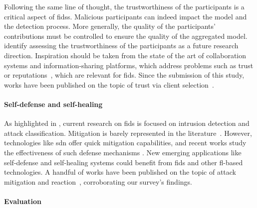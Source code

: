 Following the same line of thought, the trustworthiness of the participants is a critical aspect of \glspl{fids}.
Malicious participants can indeed impact the model and the detection process.
More generally, the quality of the participants' contributions must be controlled to ensure the quality of the aggregated model.
\textcite{zhang_BlockchainbasedFederatedLearning_2020} identify assessing the trustworthiness of the participants as a future research direction.
Inspiration should be taken from the state of the art of collaboration systems and information-sharing platforms, which address problems such as trust or reputations~\cite{wagner_Cyberthreatintelligence_2019a,skopik_problemsharedproblem_2016}, which are relevant for \gls{fids}.
Since the submission of this study, works have been published on the topic of trust via client selection~\cite{cunhaneto_FedSBSFederatedLearningparticipantselection_2024}.


\paragraph{Self-defense and self-healing}

As highlighted in , current research on \gls{fids} is focused on intrusion detection and attack classification.
Mitigation is barely represented in the literature~\cite{rathore_BlockSecIoTNetBlockchainbaseddecentralized_2019}.
However, technologies like \gls{sdn} offer quick mitigation capabilities, and recent works study the effectiveness of such defense mechanisms \cite{bhunia_Dynamicattackdetection_2017,singh_DetectionmitigationDDoS_2020}.
New emerging applications like self-defense and self-healing systems could benefit from \gls{fids} and other \gls{fl}-based technologies.
A handful of works have been published on the topic of attack mitigation and reaction~\cite{panagoda_ApplicationFederatedLearning_2022,decaldasfilho_BotnetDetectionMitigation_2023,phan_FEARFederatedCyberAttack_2022}, corroborating our survey's findings.


\paragraph{Evaluation}

